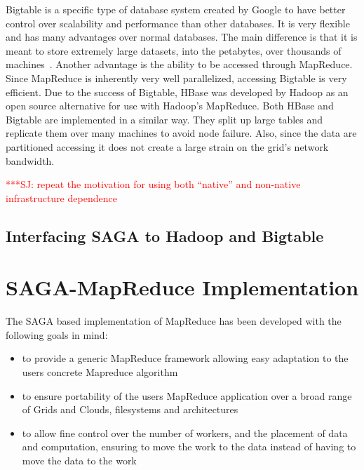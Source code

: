 \documentclass[conference,final]{IEEEtran}
\newcommand{\jhanote}[1]{ {\textcolor{red} { ***SJ: #1 }}}
\newcommand{\jhanote}[1]{}
\begin{document}
Bigtable is a specific type of database system created by Google to
have better control over scalability and performance than other
databases.  It is very flexible and has many advantages over normal
databases.  The main difference is that it is meant to store extremely
large datasets, into the petabytes, over thousands of
machines~\cite{bigtable}.  Another advantage is the ability to be
accessed through MapReduce.  Since MapReduce is inherently very well
parallelized, accessing Bigtable is very efficient.  Due to the
success of Bigtable, HBase was developed by Hadoop as an open source
alternative for use with Hadoop's MapReduce.  Both HBase and Bigtable
are implemented in a similar way.  They split up large tables and
replicate them over many machines to avoid node failure.  Also, since
the data are partitioned accessing it does not create a large strain
on the grid's network bandwidth.


\jhanote{repeat the motivation for using both ``native'' and
  non-native infrastructure dependence}

\subsection*{Interfacing SAGA to Hadoop and Bigtable}


\section{SAGA-MapReduce Implementation}

The SAGA based implementation of MapReduce has been developed with the following
goals in mind:

\begin{itemize}
	\item to provide a generic MapReduce framework allowing easy adaptation to 
	      the users concrete Mapreduce algorithm
	\item to ensure portability of the users MapReduce application over a broad range
	      of Grids and Clouds, filesystems and architectures
	\item to allow fine control over the number of workers, and the placement of 
	      data and computation, ensuring to move the work to the data instead of
	      having to move the data to the work
\end{itemize}
\end{document}
